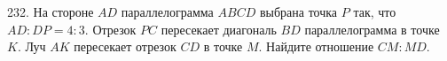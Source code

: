 232. На стороне $AD$ параллелограмма $ABCD$ выбрана точка $P$ так, что $AD:DP=4:3.$ Отрезок $PC$ пересекает диагональ $BD$ параллелограмма в точке $K.$ Луч $AK$ пересекает отрезок $CD$ в точке $M.$ Найдите отношение $CM:MD.$\\
